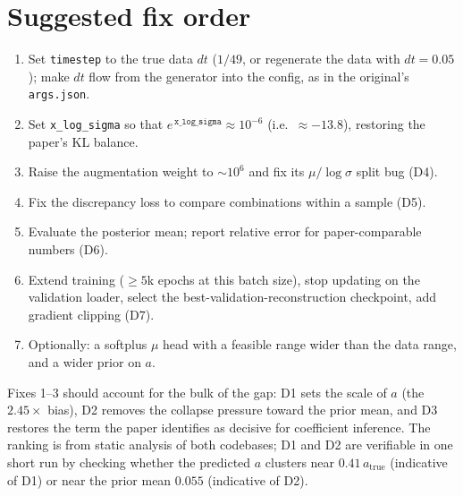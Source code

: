 \documentclass[11pt,a4paper]{article}
\newcommand{\code}[1]{\texttt{#1}}
\begin{document}
\section{Suggested fix order}
\label{sec:fixes}

\begin{enumerate}
  \item Set \code{timestep} to the true data $dt$ ($1/49$, or regenerate the data with
        $dt = 0.05$); make $dt$ flow from the generator into the config, as in the
        original's \code{args.json}.
  \item Set \code{x\_log\_sigma} so that $e^{\,\code{x\_log\_sigma}} \approx 10^{-6}$
        (i.e.\ $\approx -13.8$), restoring the paper's KL balance.
  \item Raise the augmentation weight to $\sim10^6$ and fix its $\mu/\log\sigma$ split
        bug (D4).
  \item Fix the discrepancy loss to compare combinations within a sample (D5).
  \item Evaluate the posterior mean; report relative error for paper-comparable
        numbers (D6).
  \item Extend training ($\ge 5$k epochs at this batch size), stop updating on the
        validation loader, select the best-validation-reconstruction checkpoint, add
        gradient clipping (D7).
  \item Optionally: a softplus $\mu$ head with a feasible range wider than the data
        range, and a wider prior on $a$.
\end{enumerate}

Fixes 1--3 should account for the bulk of the gap: D1 sets the scale of $a$ (the
$2.45\times$ bias), D2 removes the collapse pressure toward the prior mean, and D3
restores the term the paper identifies as decisive for coefficient inference. The
ranking is from static analysis of both codebases; D1 and D2 are verifiable in one
short run by checking whether the predicted $a$ clusters near $0.41\,a_\mathrm{true}$
(indicative of D1) or near the prior mean $0.055$ (indicative of D2).
\end{document}
